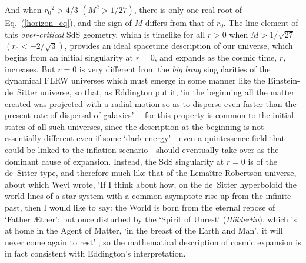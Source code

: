 And when ${r_0}^2>4/3$ $(M^2>1/27)$, there is only one real root of Eq.~(\ref{horizon_eq}), and the sign of $M$ differs from that of $r_0$. The line-element of this \textit{over-critical} SdS geometry, which is timelike for all $r>0$ when $M>1/\sqrt{27}$ $(r_0<-2/\sqrt{3})$, provides an ideal spacetime description of our universe, which begins from an initial singularity at $r=0$, and expands as the cosmic time, $r$, increases. But $r=0$ is very different from the \textit{big bang} singularities of the dynamical FLRW universes which must emerge in some manner like the Einstein-de~Sitter universe, so that, as Eddington put it, `in the beginning all the matter created was projected with a radial motion so as to disperse even faster than the present rate of dispersal of galaxies' \cite{Eddington1933}---for this property is common to the initial states of all such universes, since the description at the beginning is not essentially different even if some `dark energy'---even a quintessence field that could be linked to the inflation scenario---should eventually take over as the dominant cause of expansion. Instead, the SdS singularity at $r=0$ is of the de~Sitter-type, and therefore much like that of the Lema\^{i}tre-Robertson universe, about which Weyl wrote, `If I think about how, on the de~Sitter hyperboloid the world lines of a star system with a common asymptote rise up from the infinite past, then I would like to say: the World is born from the eternal repose of `Father {\AE}ther'; but once disturbed by the `Spirit of Unrest' (\textit{H\"{o}lderlin}), which is at home in the Agent of Matter, `in the breast of the Earth and Man', it will never come again to rest' \cite{Weyl1924}; so the mathematical description of cosmic expansion is in fact consistent with Eddington's interpretation.

